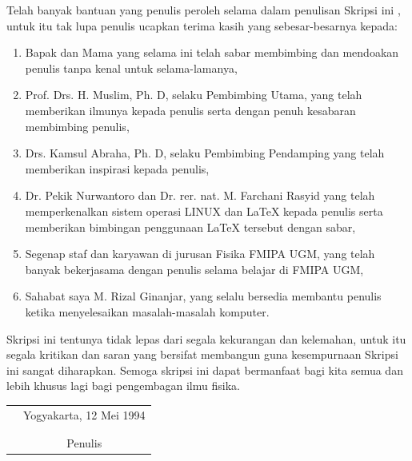 \documentclass[skrips,inggris]{ugmskripsi}
\begin{document}
Telah banyak bantuan yang penulis peroleh selama dalam penulisan Skripsi ini
, untuk itu tak lupa penulis ucapkan terima kasih yang sebesar-besarnya
kepada:
\begin{enumerate}
\item{Bapak dan Mama yang selama ini telah sabar membimbing dan mendoakan
penulis tanpa kenal untuk selama-lamanya,}
\item{Prof. Drs. H. Muslim, Ph. D, selaku Pembimbing Utama, yang telah
memberikan ilmunya kepada penulis serta dengan penuh kesabaran membimbing penulis,}
\item{Drs. Kamsul Abraha, Ph. D, selaku Pembimbing Pendamping yang telah
memberikan inspirasi kepada penulis,} 
\item{Dr. Pekik Nurwantoro dan Dr. rer. nat. M. Farchani Rasyid
yang telah memperkenalkan sistem operasi LINUX dan \LaTeX{} kepada penulis serta
memberikan bimbingan penggunaan \LaTeX{} tersebut dengan sabar,} 
\item{Segenap staf dan karyawan di jurusan Fisika FMIPA UGM, yang telah
banyak bekerjasama dengan penulis selama belajar di FMIPA UGM,} 
\item{Sahabat saya M. Rizal Ginanjar, yang selalu bersedia membantu penulis ketika
menyelesaikan masalah-masalah komputer.} 
\end{enumerate}

Skripsi ini tentunya tidak lepas dari segala kekurangan dan kelemahan, untuk itu
segala kritikan dan saran yang bersifat membangun guna kesempurnaan Skripsi ini
sangat diharapkan. Semoga skripsi ini dapat bermanfaat bagi kita semua dan lebih
khusus lagi bagi pengembagan ilmu fisika.

\begin{tabular}{p{7.5cm}c}
&Yogyakarta, 12 Mei 1994\\
&\\
&\\
&Penulis
\end{tabular}

\tableofcontents
\listoftables
\listoffigures
\end{document}
